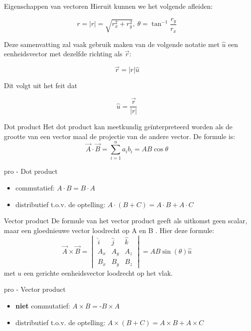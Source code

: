 \begin{pro}{Eigenschappen van vectoren}
    \noindent Hieruit kunnen we het volgende afleiden:
    
    \begin{equation*}
        r = |r| = \sqrt{r_x^2 + r_y^2}, \ \theta = \tan^{-1}\dfrac{r_y}{r_x}
    \end{equation*}

    \noindent Deze samenvatting zal vaak gebruik maken van de volgende notatie met $\hat{u}$ een eenheidsvector met dezelfde richting als $\Vec{r}$:

    \begin{equation*}
        \Vec{r} = |r|\hat{u}
    \end{equation*}

    \noindent Dit volgt uit het feit dat 
    
    \begin{equation*}
        \hat{u} = \dfrac{\Vec{r}}{|r|}
    \end{equation*}
\end{pro}

\newpage

\begin{theo}{Dot product}
    Het dot product kan meetkundig geïnterpreteerd worden als de grootte van een vector maal de projectie van de andere vector. De formule is:
    \begin{equation*}
        \Vec{A} \cdot \Vec{B} = \sum_{i=1}^n a_ib_i = AB\cos{\theta}
    \end{equation*}
    \vspace{-0.5cm}
\end{theo}

\begin{pro}{pro - Dot product}
    \begin{itemize} 
    \item commutatief: $ A \cdot B = B \cdot A $
    \item distributief t.o.v. de optelling: $ A \cdot (B+C) = A \cdot B + A \cdot C $
\end{itemize}
\end{pro}

\begin{theo}{Vector product}
    De formule van het vector product geeft als uitkomst geen scalar, maar een gloednieuwe vector loodrecht op A en B . Hier deze formule:
    \begin{equation*}
        \Vec{A} \times \Vec{B} = \begin{vmatrix}
         \hat{i} & \hat{j} & \hat{k}\\ 
         A_x & A_y & A_z\\
         B_x & B_y & B_z  \end{vmatrix} = AB\sin(\theta) \hat{u}
    \end{equation*}
    met $\hat{u}$ een gerichte eenheidsvector loodrecht op het vlak.
\end{theo}

\begin{pro}{pro - Vector product}
    \begin{itemize} 
        \item \textbf{niet} commutatief: $ A \times B = \textbf{-}B \times A $
        \item distributief t.o.v. de optelling: $ A \times (B+C) = A \times B + A \times C $
    \end{itemize}
\end{pro}
